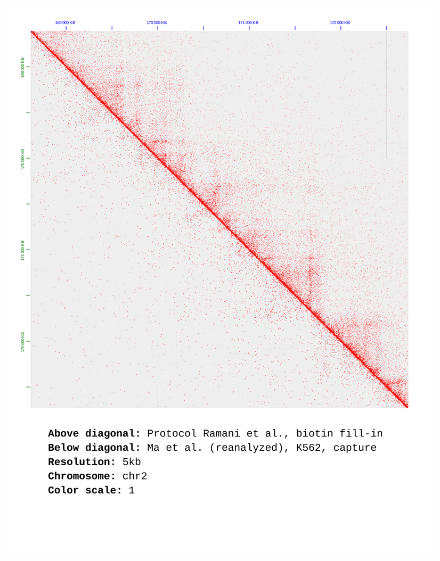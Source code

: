 \documentclass[a4paper,14pt]{extarticle}
\begin{document}
\begin{figure}[hp!] \includegraphics[width=1\textwidth]{ma-pe_s30_chr2_5kb_1.pdf} \end{figure}
\end{document}

